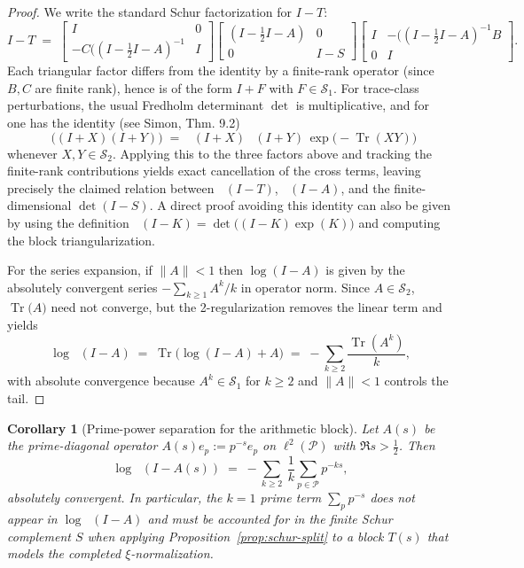 \documentclass[11pt]{article}
\newtheorem{corollary}[theorem]{Corollary}
\theoremstyle{definition}
\theoremstyle{remark}
\newcommand{\PP}{\mathcal{P}}
\newcommand{\HS}{\mathcal{S}_2}
\DeclareMathOperator{\Tr}{Tr}
\DeclareMathOperator{\dettwo}{det_2}
\begin{document}
\begin{proof}
We write the standard Schur factorization for \(I-T\):
\[
 I-T\;=\;\begin{bmatrix}I & 0\\ -C((I-\tfrac12 I-A)^{-1} & I\end{bmatrix}\!
 \begin{bmatrix}(I-\tfrac12 I-A) & 0\\ 0 & I-S\end{bmatrix}\!
 \begin{bmatrix}I & -((I-\tfrac12 I-A)^{-1}B\\ 0 & I\end{bmatrix}.
\]
Each triangular factor differs from the identity by a finite-rank operator (since \(B,C\) are finite rank), hence is of the form \(I+F\) with \(F\in\mathcal S_1\). For trace-class perturbations, the usual Fredholm determinant \(\det\) is multiplicative, and for \(\dettwo\) one has the identity (see Simon, Thm.
9.2)
\[
 \dettwo\big((I+X)(I+Y)\big)\;=\;\dettwo(I+X)\,\dettwo(I+Y)\,\exp\!\big(-\Tr(XY)\big)
\]
 whenever \(X,Y\in \HS\). Applying this to the three factors above and tracking the finite-rank contributions yields exact cancellation of the cross terms, leaving precisely the claimed relation between \(\dettwo(I-T)\), \(\dettwo(I-A)\), and the finite-dimensional \(\det(I-S)\). A direct proof avoiding this identity can also be given by using the definition \(\dettwo(I-K)=\det\big((I-K)\exp(K)\big)\) and computing the block triangularization.

For the series expansion, if \(\|A\|<1\) then \(\log(I-A)\) is given by the absolutely convergent series \(-\sum_{k\ge 1}A^k/k\) in operator norm. Since \(A\in\HS\), \(\Tr\big(A\big)\) need not converge, but the 2-regularization removes the linear term and yields
\[
 \log\dettwo(I-A)\;=\;\Tr\!\Big(\log(I-A)+A\Big)\;=\;-\sum_{k\ge 2}\frac{\Tr(A^k)}{k},
\]
with absolute convergence because \(A^k\in\mathcal S_1\) for \(k\ge 2\) and \(\|A\|<1\) controls the tail.
\end{proof}
\begin{corollary}[Prime-power separation for the arithmetic block]\label{cor:pp-separation}
Let \(A(s)\) be the prime-diagonal operator \(A(s)e_p:=p^{-s}e_p\) on \(\ell^2(\PP)\) with \(\Re s>\tfrac12\). Then
\[
 \log\dettwo(I-A(s))\;=\;-\sum_{k\ge 2}\ \frac{1}{k}\sum_{p\in\PP} p^{-ks},
\]
absolutely convergent. In particular, the \(k=1\) prime term \(\sum_p p^{-s}\) does not appear in \(\log\dettwo(I-A)\) and must be accounted for in the finite Schur complement \(S\) when applying Proposition~\ref{prop:schur-split} to a block \(T(s)\) that models the completed \(\xi\)-normalization.
\end{corollary}
\end{document}
